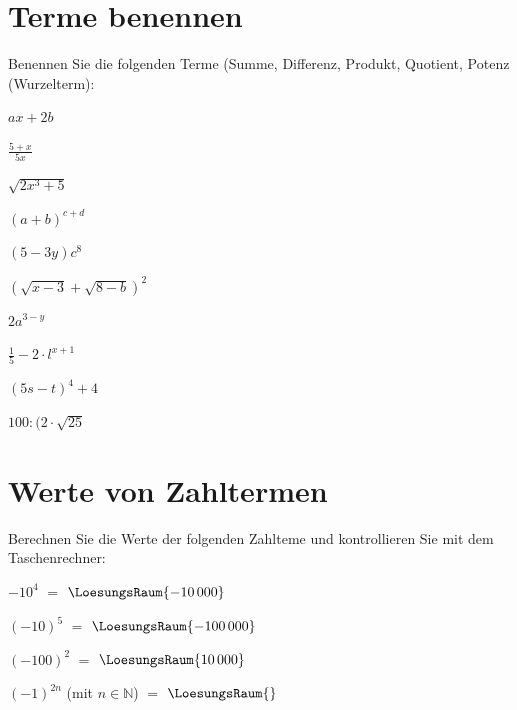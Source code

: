 
\renewcommand{\bbwAufgabenBlockID}{A1Be}

\renewcommand{\metaHeaderLine}{Aufgabenblatt}
\renewcommand{\arbeitsblattTitel}{Algebra: Terme}



\arbeitsblattHeader{}
\section{Terme benennen}
Benennen Sie die folgenden Terme (Summe, Differenz, Produkt, Quotient,
Potenz (Wurzelterm):

\begin{bbwAufgabenBlock}
\item $ax+2b$ \, 
\item $\frac{5+x}{5x}$ \, 
\item $\sqrt{2x^3+5}$ \, 
\item $(a+b)^{c+d}$ \, 
\item $(5-3y)c^8$ \, 
\item $(\sqrt{x-3}+\sqrt{8-b})^2$ \, 
\item $2a^{3-y}$ \, 
\item $\frac15 - 2\cdot{}l^{x+1}$ \, 
\item $(5s-t)^4+4$ \, 
\item $100:(2\cdot{}\sqrt{25}$ \, 
\end{bbwAufgabenBlock}

\platzFuerBerechnungenBisEndeSeite{}



\section{Werte von Zahltermen}
Berechnen Sie die Werte der folgenden Zahlteme und kontrollieren Sie
mit dem Taschenrechner:

\begin{bbwAufgabenBlock}
\item $-10^4$ $=$ $\LoesungsRaum{-10\,000}$
\item $(-10)^5$ $=$ $\LoesungsRaum{-100\,000}$
\item $(-100)^2$ $=$ $\LoesungsRaum{10\,000}$
\item $(-1)^{2n}$  (mit $n\in\mathbb{N}$)  $=$ $\LoesungsRaum{}$

\end{bbwAufgabenBlock}

